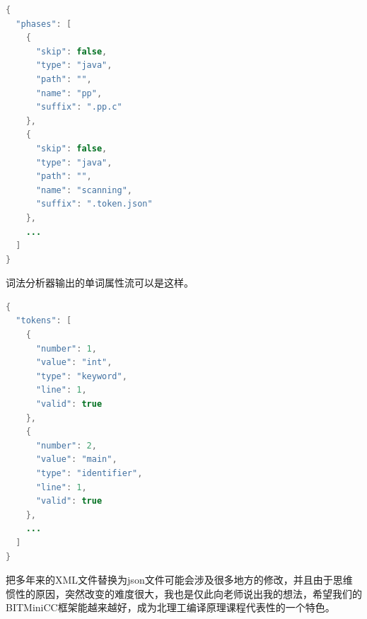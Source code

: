 \documentclass[UTF8, twoside, titlepage]{ctexart}
\begin{document}
\begin{lstlisting}[language=Java,
	xleftmargin=1cm,xrightmargin=1cm]
{
  "phases": [
    {
      "skip": false,
      "type": "java",
      "path": "",
      "name": "pp",
      "suffix": ".pp.c"
    },
    {
      "skip": false,
      "type": "java",
      "path": "",
      "name": "scanning",
      "suffix": ".token.json"
    },
    ...
  ]
}
\end{lstlisting}

词法分析器输出的单词属性流可以是这样。

\begin{lstlisting}[language=Java,
	xleftmargin=1cm,xrightmargin=1cm]
{
  "tokens": [
    {
      "number": 1,
      "value": "int",
      "type": "keyword",
      "line": 1,
      "valid": true
    },
    {
      "number": 2,
      "value": "main",
      "type": "identifier",
      "line": 1,
      "valid": true
    },
    ...
  ]
}
\end{lstlisting}

把多年来的XML文件替换为json文件可能会涉及很多地方的修改，并且由于思维惯性的原因，突然改变的难度很大，我也是仅此向老师说出我的想法，希望我们的BITMiniCC框架能越来越好，成为北理工编译原理课程代表性的一个特色。

\cleardoublepage

\newpage\null
\thispagestyle{empty}
\cleardoublepage
\end{document}
